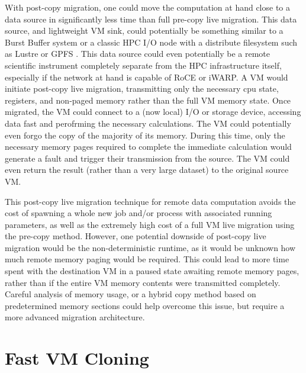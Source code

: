 With post-copy migration, one could move the computation at hand close to a data source in significantly less time than full pre-copy live migration. This data source, and lightweight VM sink, could potentially be something similar to a Burst Buffer system \cite{Lofstead2014,wright2015trinity} or a classic HPC I/O node with a distribute filesystem such as Lustre or GPFS \cite{schmuck2002gpfs}. This data source could even potentially be a remote scientific instrument completely separate from the HPC infrastructure itself, especially if the network at hand is capable of RoCE \cite{beck2011roce} or iWARP\cite{rashti200710}.  A VM would initiate post-copy live migration, transmitting  only the necessary cpu state, registers, and non-paged memory rather than the full VM memory state. Once migrated, the VM could connect to a (now local) I/O or storage device, accessing data fast and perofrming the necessary calculations. The VM could potentially even forgo the copy of the majority of its memory. During this time, only the necessary memory pages required to complete the immediate calculation would generate a fault and trigger their transmission from the source.  The VM could even return the result (rather than a very large dataset) to the original source VM. 

This post-copy live migration technique for remote data computation avoids the cost of spawning a whole new job and/or process with associated running parameters, as well as the extremely high cost of a full VM live migration using the pre-copy method. However, one potential downside of post-copy live migration would be the non-deterministic runtime, as it would be unknown how much remote memory paging would be required. This could lead to more time spent with the destination VM in a paused state awaiting remote memory pages, rather than if the entire VM memory contents were transmitted completely. Careful analysis of memory usage, or a hybrid copy method based on predetermined memory sections could help overcome this issue, but require a more advanced migration architecture. 






\section{Fast VM Cloning}
\label{vmcloning}

